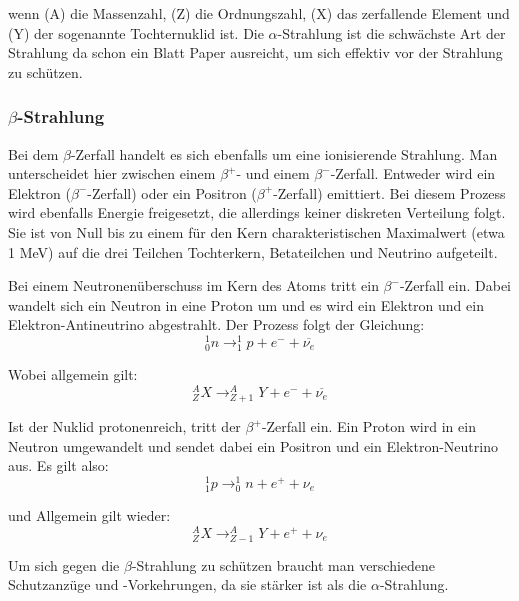 wenn (A) die Massenzahl, (Z) die Ordnungszahl, (X) das zerfallende Element und (Y) der sogenannte Tochternuklid ist. Die $\alpha$-Strahlung ist die schwächste Art der Strahlung da schon ein Blatt Paper ausreicht, um sich effektiv vor der Strahlung zu schützen.

\subsubsection*{$\beta$-Strahlung}
Bei dem $\beta$-Zerfall handelt es sich ebenfalls um eine ionisierende Strahlung. Man unterscheidet hier zwischen einem $\beta^{+}$- und einem $\beta^{-}$-Zerfall. Entweder wird ein Elektron ($\beta^{-}$-Zerfall) oder ein Positron ($\beta^{+}$-Zerfall) emittiert. Bei diesem Prozess wird ebenfalls Energie freigesetzt, die allerdings keiner diskreten Verteilung folgt. Sie ist von Null bis zu einem für den Kern charakteristischen Maximalwert (etwa 1 MeV) auf die drei Teilchen Tochterkern, Betateilchen und Neutrino aufgeteilt.

Bei einem Neutronenüberschuss im Kern des Atoms tritt ein $\beta^{-}$-Zerfall ein. Dabei wandelt sich ein Neutron in eine Proton um und es wird ein Elektron und ein Elektron-Antineutrino abgestrahlt. Der Prozess folgt der Gleichung:
\begin{equation}
^{1}_{0}n \rightarrow ^{1}_{1}p + e^{-} + \overline{\nu_{e}}
\end{equation}

Wobei allgemein gilt:
\begin{equation}
^{A}_{Z}X \rightarrow ^{A}_{Z+1}Y + e^{-} + \overline{\nu_{e}}
\end{equation}

Ist der Nuklid protonenreich, tritt der $\beta^{+}$-Zerfall ein. Ein Proton wird in ein Neutron umgewandelt und sendet dabei ein Positron und ein Elektron-Neutrino aus. Es gilt also:
\begin{equation}
^{1}_{1}p \rightarrow ^{1}_{0}n + e^{+} + \nu_{e}
\end{equation}

und Allgemein gilt wieder:
\begin{equation}
^{A}_{Z}X \rightarrow ^{A}_{Z-1}Y + e^{+} + \nu_{e}
\end{equation}

Um sich gegen die $\beta$-Strahlung zu schützen braucht man verschiedene Schutzanzüge und -Vorkehrungen, da sie stärker ist als die $\alpha$-Strahlung.

